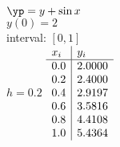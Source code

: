 {
$\yp = y + \sin x$\\
$y(0)=2$\\
interval: $[0,1]$\\
$h = 0.2$
}
{
	$\begin{array}{l | l}
		x_i & y_i    \\ \hline
		0.0 & 2.0000 \\
		0.2 & 2.4000 \\
		0.4 & 2.9197 \\
		0.6 & 3.5816 \\
		0.8 & 4.4108 \\
		1.0 & 5.4364
	\end{array}$
}